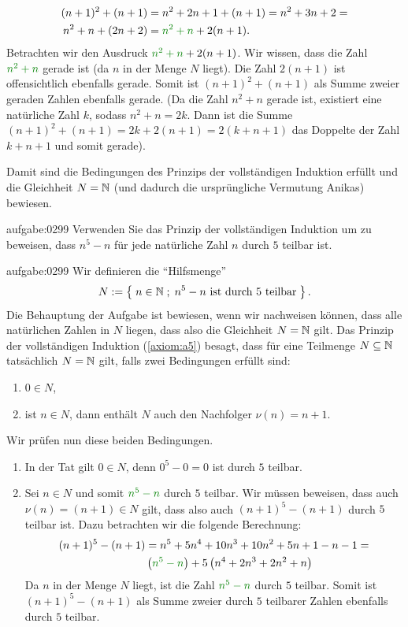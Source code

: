 {\begin{enumerate}
    \begin{align*}
        (n+1)^2+(n+1) &= n^2+2n+1+(n+1) = n^2+3n+2 =\\
        n^2+n + (2n+2) &= \textcolor{Green}{n^2+n} + 2(n+1).
    \end{align*}
    Betrachten wir den Ausdruck $\textcolor{Green}{n^2+n} + 2(n+1)$. Wir wissen, dass die Zahl $\textcolor{Green}{n^2+n}$ gerade ist (da $n$ in der Menge $N$ liegt). Die Zahl $2(n+1)$ ist offensichtlich ebenfalls gerade. Somit ist $(n+1)^2+(n+1)$ als Summe zweier geraden Zahlen ebenfalls gerade. (Da die Zahl $n^2+n$ gerade ist, existiert eine natürliche Zahl $k$, sodass $n^2+n = 2k$. Dann ist die Summe $(n+1)^2+(n+1) = 2k + 2(n+1) = 2(k+n+1)$ das Doppelte der Zahl $k+n+1$ und somit gerade). \checkmark
\end{enumerate}
Damit sind die Bedingungen des Prinzips der vollständigen Induktion erfüllt und die Gleichheit $N = \mathbb{N}$ (und dadurch die ursprüngliche Vermutung Anikas) bewiesen.
}

\begin{aufgabe}{aufgabe:0299}
Verwenden Sie das Prinzip der vollständigen Induktion um zu beweisen, dass $n^5-n$ für jede natürliche Zahl $n$ durch $5$ teilbar ist.
\end{aufgabe}
\begin{antwort}{aufgabe:0299}
Wir definieren die \enquote{Hilfsmenge}
\begin{align*}
    N:=\left\{\;n\in\mathbb{N} \; ; \; \text{$n^5-n$ ist durch $5$ teilbar} \;\right\}.
\end{align*}
Die Behauptung der Aufgabe ist bewiesen, wenn wir nachweisen können, dass alle natürlichen Zahlen in $N$ liegen, dass also die Gleichheit $N=\mathbb{N}$ gilt. Das Prinzip der vollständigen Induktion (\cref{axiom:a5}) besagt, dass für eine Teilmenge $N\subseteq\mathbb{N}$ tatsächlich $N=\mathbb{N}$ gilt, falls zwei Bedingungen erfüllt sind:
\begin{enumerate}
    \item $0\in N$,
    \item ist $n\in N$, dann enthält $N$ auch den Nachfolger $\nu(n) = n+1$.
\end{enumerate}
Wir prüfen nun diese beiden Bedingungen.
\begin{enumerate}
    \item In der Tat gilt $0\in N$, denn $0^5-0 = 0$ ist durch $5$ teilbar. \checkmark
    \item Sei $n\in N$ und somit $\textcolor{Green}{n^5-n}$ durch $5$ teilbar. Wir müssen beweisen, dass auch $\nu(n)=(n+1)\in N$ gilt, dass also auch $(n+1)^5-(n+1)$ durch $5$ teilbar ist. Dazu betrachten wir die folgende Berechnung:
    \begin{align*}
        (n+1)^5-(n+1) &= n^5+5n^4+10n^3+10n^2+5n+1-n-1 = \\
        &\lr{\textcolor{Green}{n^5-n}} + 5\lr{n^4+2n^3+2n^2+n}
    \end{align*}
    Da $n$ in der Menge $N$ liegt, ist die Zahl $\textcolor{Green}{n^5-n}$ durch $5$ teilbar. Somit ist $(n+1)^5-(n+1)$ als Summe zweier durch $5$ teilbarer Zahlen ebenfalls durch $5$ teilbar. \checkmark
\end{enumerate}
\end{antwort}

